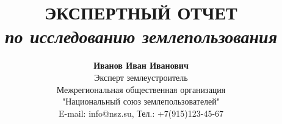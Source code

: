 
\newcommand{\DefaultOrganizationName}{Межрегиональная общественная организация \\"Национальный союз землепользователей"}
\newcommand{\DefaultOrganizationAddress}{125009, г. Москва, пер. Старопименовский, д. 13, стр 4}
\newcommand{\DefaultOrganizationPhone}{+7(915)123-45-67}
\newcommand{\DefaultOrganizationEmail}{info@nsz.su}
\newcommand{\DefaultOrganizationWebsite}{https://nsz.su/}

\newcommand{\DefaultExpertName}{Иванов Иван Иванович}
\newcommand{\DefaultExpertPosition}{Эксперт землеустроитель}
\newcommand{\DefaultExpertContacts}{\texttt{+7(916)123-45-67}, \texttt{expert@yandex.ru}}

\newcommand{\DefaultReportTitle}{ЭКСПЕРТНЫЙ ОТЧЕТ}
\newcommand{\DefaultReportSubject}{по исследованию землепользования}
\newcommand{\DefaultReportCity}{Москва}
\newcommand{\DefaultReportYear}{\the\year}
\newcommand{\DefaultReportDate}{\the\year}

\newcommand{\DefaultHeaderText}{Экспертное заключение}


\newcommand{\OrganizationName}{\DefaultOrganizationName}
\newcommand{\OrganizationAddress}{\DefaultOrganizationAddress}
\newcommand{\OrganizationPhone}{\DefaultOrganizationPhone}
\newcommand{\OrganizationEmail}{\DefaultOrganizationEmail}
\newcommand{\OrganizationWebsite}{\DefaultOrganizationWebsite}

\newcommand{\ExpertName}{\DefaultExpertName}
\newcommand{\ExpertPosition}{\DefaultExpertPosition}
\newcommand{\ExpertContacts}{\DefaultExpertContacts}

\newcommand{\ReportTitle}{\DefaultReportTitle}
\newcommand{\ReportSubject}{\DefaultReportSubject}
\newcommand{\ReportCity}{\DefaultReportCity}
\newcommand{\ReportYear}{\DefaultReportYear}
\newcommand{\ReportDate}{\DefaultReportDate}

\newcommand{\HeaderText}{\DefaultHeaderText}

 \title{
     \LARGE\textbf{\ReportTitle} \\
     \large\textit{\ReportSubject}
 }
 
 \author{
     \small\textbf{\ExpertName} \\[4pt]
     \small \ExpertPosition \\
     \small \OrganizationName \\
     \small {E-mail: \OrganizationEmail}, \small {Тел.: \OrganizationPhone}
 }
 
 \date{
     \small\textbf{\ReportDate} \\[4pt]
 }

\makeatletter
\renewcommand{\@biblabel}[1]{#1.} %
\makeatother